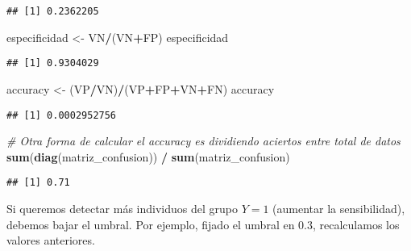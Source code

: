 \documentclass[
]{article}
\newenvironment{Shaded}{\begin{snugshade}}{\end{snugshade}}
\newcommand{\AttributeTok}[1]{\textcolor[rgb]{0.13,0.29,0.53}{#1}}
\newcommand{\CommentTok}[1]{\textcolor[rgb]{0.56,0.35,0.01}{\textit{#1}}}
\newcommand{\DecValTok}[1]{\textcolor[rgb]{0.00,0.00,0.81}{#1}}
\newcommand{\FloatTok}[1]{\textcolor[rgb]{0.00,0.00,0.81}{#1}}
\newcommand{\FunctionTok}[1]{\textcolor[rgb]{0.13,0.29,0.53}{\textbf{#1}}}
\newcommand{\NormalTok}[1]{#1}
\newcommand{\OtherTok}[1]{\textcolor[rgb]{0.56,0.35,0.01}{#1}}
\newcommand{\SpecialCharTok}[1]{\textcolor[rgb]{0.81,0.36,0.00}{\textbf{#1}}}
\newcommand{\StringTok}[1]{\textcolor[rgb]{0.31,0.60,0.02}{#1}}
\begin{document}
\begin{verbatim}
## [1] 0.2362205
\end{verbatim}

\begin{Shaded}
\begin{Highlighting}[]
\NormalTok{especificidad }\OtherTok{\textless{}{-}}\NormalTok{ VN}\SpecialCharTok{/}\NormalTok{(VN}\SpecialCharTok{+}\NormalTok{FP)}
\NormalTok{especificidad}
\end{Highlighting}
\end{Shaded}

\begin{verbatim}
## [1] 0.9304029
\end{verbatim}

\begin{Shaded}
\begin{Highlighting}[]
\NormalTok{accuracy }\OtherTok{\textless{}{-}}\NormalTok{ (VP}\SpecialCharTok{/}\NormalTok{VN)}\SpecialCharTok{/}\NormalTok{(VP}\SpecialCharTok{+}\NormalTok{FP}\SpecialCharTok{+}\NormalTok{VN}\SpecialCharTok{+}\NormalTok{FN)}
\NormalTok{accuracy}
\end{Highlighting}
\end{Shaded}

\begin{verbatim}
## [1] 0.0002952756
\end{verbatim}

\begin{Shaded}
\begin{Highlighting}[]
\CommentTok{\# Otra forma de calcular el accuracy es dividiendo aciertos entre total de datos}
\FunctionTok{sum}\NormalTok{(}\FunctionTok{diag}\NormalTok{(matriz\_confusion)) }\SpecialCharTok{/} \FunctionTok{sum}\NormalTok{(matriz\_confusion)}
\end{Highlighting}
\end{Shaded}

\begin{verbatim}
## [1] 0.71
\end{verbatim}

Si queremos detectar más individuos del grupo \(Y=1\) (aumentar la
sensibilidad), debemos bajar el umbral. Por ejemplo, fijado el umbral en
0.3, recalculamos los valores anteriores.

\begin{Shaded}
\end{Shaded}
\end{document}
